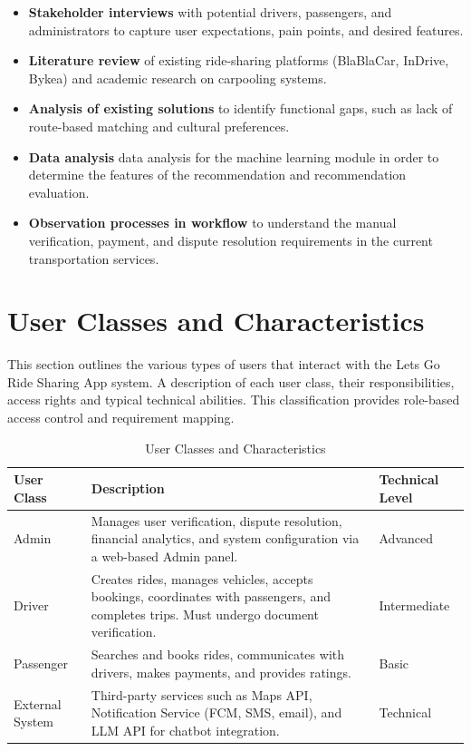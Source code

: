 \begin{itemize}
    \item \textbf{Stakeholder interviews} with potential drivers, passengers, and administrators to capture user expectations, pain points, and desired features.
    \item \textbf{Literature review} of existing ride-sharing platforms (BlaBlaCar, InDrive, Bykea) and academic research on carpooling systems.
    \item \textbf{Analysis of existing solutions} to identify functional gaps, such as lack of route-based matching and cultural preferences.
    \item \textbf{Data analysis} data analysis for the machine learning module in order to determine the features of the recommendation and recommendation evaluation.
    \item \textbf{Observation processes in workflow} to understand the manual verification, payment, and dispute resolution requirements in the current transportation services.
\end{itemize}

\section{User Classes and Characteristics}

This section outlines the various types of users that interact with the Lets Go Ride Sharing App system. A description of each user class, their responsibilities, access rights and typical technical abilities. This classification provides role-based access control and requirement mapping.


\begin{table}[htbp]
\centering
\caption{User Classes and Characteristics}
\begin{tabularx}{\textwidth}{|p{3cm}|X|p{3cm}|}
\hline
\rowcolor{lightgray!30}
\textbf{User Class} & \textbf{Description} & \textbf{Technical Level} \\
\hline
Admin & Manages user verification, dispute resolution, financial analytics, and system configuration via a web-based Admin panel. & Advanced \\
\hline
Driver & Creates rides, manages vehicles, accepts bookings, coordinates with passengers, and completes trips. Must undergo document verification. & Intermediate \\
\hline
Passenger & Searches and books rides, communicates with drivers, makes payments, and provides ratings. & Basic \\
\hline
External System & Third-party services such as Maps API, Notification Service (FCM, SMS, email), and LLM API for chatbot integration. & Technical \\
\hline
\end{tabularx}
\end{table}

